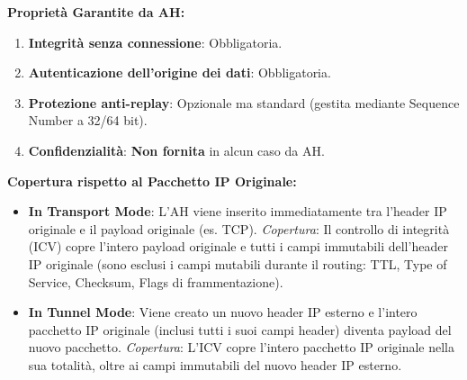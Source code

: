 \documentclass[11pt,a4paper]{article}
\begin{document}
\begin{solutionbox}
\textbf{Propriet\`a Garantite da AH:}
\begin{enumerate}
    \item \textbf{Integrit\`a senza connessione}: Obbligatoria.
    \item \textbf{Autenticazione dell'origine dei dati}: Obbligatoria.
    \item \textbf{Protezione anti-replay}: Opzionale ma standard (gestita mediante Sequence Number a 32/64 bit).
    \item \textbf{Confidenzialit\`a}: \textbf{Non fornita} in alcun caso da AH.
\end{enumerate}

\textbf{Copertura rispetto al Pacchetto IP Originale:}
\begin{itemize}
    \item \textbf{In Transport Mode}: L'AH viene inserito immediatamente tra l'header IP originale e il payload originale (es. TCP).
    \textit{Copertura}: Il controllo di integrit\`a (ICV) copre l'intero payload originale e tutti i campi immutabili dell'header IP originale (sono esclusi i campi mutabili durante il routing: TTL, Type of Service, Checksum, Flags di frammentazione).
    \item \textbf{In Tunnel Mode}: Viene creato un nuovo header IP esterno e l'intero pacchetto IP originale (inclusi tutti i suoi campi header) diventa payload del nuovo pacchetto.
    \textit{Copertura}: L'ICV copre l'intero pacchetto IP originale nella sua totalit\`a, oltre ai campi immutabili del nuovo header IP esterno.
\end{itemize}
\end{solutionbox}
\end{document}
